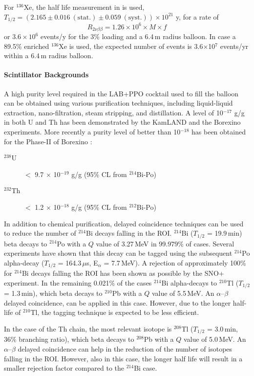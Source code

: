 For $^{136}$Xe, the half life measurement in \cite{gando16, exo14} is used,
$T_{1/2}=(2.165\pm0.016~\mathrm{(stat.)}\pm0.059~\mathrm{(syst.)})\times10^{21}$
y, for a rate of
\begin{equation}
R_{2\nu\beta\beta} = 1.26 \times 10^{6} \times M \times f
\end{equation} 
or $3.6\times10^6$ events/y for the 3\% loading and a 6.4\,m radius balloon.
In case a 89.5\% enriched $^{136}$Xe is used, the expected number of events is
3.6$\times$10$^{7}$ events/yr within a 6.4\,m radius balloon.
 
\paragraph{Scintillator Backgrounds}
A high purity level required in the LAB+PPO cocktail used to fill the balloon
can be obtained using various purification techniques, including liquid-liquid
extraction, nano-filtration, steam stripping, and distillation. A level
of 10$^{-17}$ g/g in both U and Th has been demonstrated by the
KamLAND \cite{kam03} and the Borexino \cite{bxo09} experiments. More recently
a purity level of better than 10$^{-18}$ has been obtained for the Phase-II
of Borexino \cite{bxo16}:
\begin{description}
\item[$^{238}$U] $<$ 9.7 $\times$ 10$^{-19}$ g/g (95\% CL from $^{214}$Bi-Po)
\item[$^{232}$Th] $<$ 1.2 $\times$ 10$^{-18}$ g/g (95\% CL from $^{212}$Bi-Po)
\end{description}

In addition to chemical purification, delayed coincidence techniques can
be used to reduce the number of $^{214}$Bi decays falling in the ROI.
$^{214}$Bi ($T_{1/2}$ = 19.9\,min) beta decays to $^{214}$Po with a $Q$ value
of 3.27\,MeV in 99.979\% of cases. Several experiments have shown that this
decay can be tagged using the subsequent $^{214}$Po alpha-decay
($T_{1/2}$ = 164.3\,$\mu$s, E$_{\alpha}$ = 7.7\,MeV). A rejection of
approximately 100\% for $^{214}$Bi decays falling the ROI has been shown as
possible by the SNO+ experiment.
In the remaining 0.021\% of the cases $^{214}$Bi alpha-decays to $^{210}$Tl
($T_{1/2}$ = 1.3\,min), which beta decays to $^{210}$Pb with a $Q$ value of
5.5\,MeV. An $\alpha$--$\beta$ delayed coincidence, can be applied in this
case. However, due to the longer half-life of $^{210}$Tl, the tagging
technique is expected to be less efficient.

In the case of the Th chain, the most relevant isotope is $^{208}$Tl
($T_{1/2}$ = 3.0\,min, 36\% branching ratio), which beta decays to $^{208}$Pb
with a $Q$ value of 5.0\,MeV. An $\alpha$--$\beta$ delayed coincidence can
help in the reduction of the number of isotopes falling in the ROI. However,
also in this case, the longer half life will result in a smaller rejection
factor compared to the $^{214}$Bi case.\\

